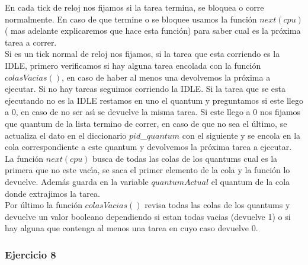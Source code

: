 En cada tick de reloj nos fijamos si la tarea termina, se bloquea o corre normalmente. En caso de que termine o se bloquee usamos 
la funci\'{o}n $next(cpu)$ ( mas adelante explicaremos que hace esta funci\'{o}n) para saber cual es la pr\'{o}xima 
tarea a correr. \\Si es un tick normal de reloj nos fijamos, si la tarea que esta corriendo es la IDLE, primero verificamos si hay 
alguna tarea encolada con la funci\'{o}n $colasVacias()$, en caso de haber al menos una devolvemos la pr\'{o}xima a ejecutar. Si 
no hay tareas seguimos corriendo la IDLE. Si la tarea que se esta ejecutando no es la IDLE restamos en uno el quantum y preguntamos 
si este llego a 0, en caso de no ser as\'{\i} se devuelve la misma tarea. Si este llego a 0 nos fijamos que quantum de la lista 
termino de correr, en caso de que no sea el \'{u}ltimo, se actualiza el dato en el diccionario $pid$\_$quantum$ con el siguiente y 
se encola en la cola correspondiente a este quantum y devolvemos la pr\'{o}xima tarea a ejecutar.\\

La funci\'{o}n $next(cpu)$ busca de todas las colas de los quantums cual es la primera que no este vac\'{\i}a, se saca el 
primer elemento de la cola y la funci\'{o}n lo devuelve. Adem\'{a}s guarda en la variable $quantumActual$ el quantum de la cola 
donde extrajimos la tarea.\\

Por \'{u}ltimo la funci\'{o}n $colasVacias()$ revisa todas las colas de los quantums y devuelve un valor booleano dependiendo si 
estan todas vacias (devuelve 1) o si hay alguna que contenga al menos una tarea en cuyo caso devuelve 0.\\


\subsubsection[Resolución Ejercicio 8]{Ejercicio 8}

